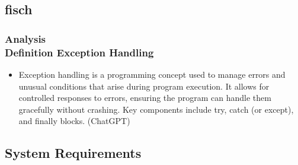 \documentclass[ucs,10pt]{beamer}
\begin{document}
\subsection{fisch}

\begin{frame}
\frametitle{Analysis \\
	\small \color{rwth-blue} Definition Exception Handling}
	\begin{itemize}
		\item Exception handling is a programming concept used to manage errors and unusual conditions that arise during program execution. It allows for controlled responses to errors, ensuring the program can handle them gracefully without crashing. Key components include try, catch (or except), and finally blocks. (ChatGPT)
	\end{itemize}
\end{frame}

\subsection{System Requirements}
\end{document}
